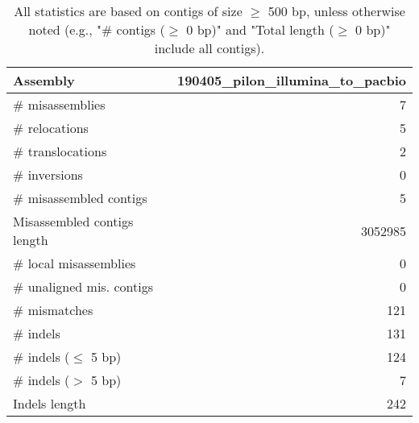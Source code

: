 \documentclass[12pt,a4paper]{article}
\begin{document}
\begin{table}[ht]
\begin{center}
\caption{All statistics are based on contigs of size $\geq$ 500 bp, unless otherwise noted (e.g., "\# contigs ($\geq$ 0 bp)" and "Total length ($\geq$ 0 bp)" include all contigs).}
\begin{tabular}{|l*{1}{|r}|}
\hline
Assembly & 190405\_pilon\_illumina\_to\_pacbio \\ \hline
\# misassemblies & 7 \\ \hline
\hspace{5mm}\# relocations & 5 \\ \hline
\hspace{5mm}\# translocations & 2 \\ \hline
\hspace{5mm}\# inversions & 0 \\ \hline
\# misassembled contigs & 5 \\ \hline
Misassembled contigs length & 3052985 \\ \hline
\# local misassemblies & 0 \\ \hline
\# unaligned mis. contigs & 0 \\ \hline
\# mismatches & 121 \\ \hline
\# indels & 131 \\ \hline
\hspace{5mm}\# indels ($\leq$ 5 bp) & 124 \\ \hline
\hspace{5mm}\# indels ($>$ 5 bp) & 7 \\ \hline
Indels length & 242 \\ \hline
\end{tabular}
\end{center}
\end{table}
\end{document}
